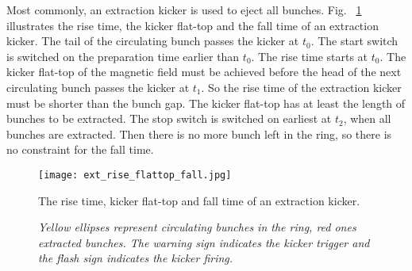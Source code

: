  
%		  
%


Most commonly, an extraction kicker is used to eject all bunches. Fig. ~\ref{ext_rise_flattop_fall} illustrates the rise time, the kicker flat-top and the fall time of an extraction kicker. The tail of the circulating bunch passes the kicker at $t_0$. The start switch is switched on the preparation time earlier than $t_0$. The rise time starts at $t_0$. The kicker flat-top of the magnetic field must be achieved before the head of the next circulating bunch passes the kicker at $t_1$. So the rise time of the extraction kicker must be shorter than the bunch gap. The kicker flat-top has at least the length of bunches to be extracted. The stop switch is switched on earliest at $t_2$, when all bunches are extracted. Then there is no more bunch left in the ring, so there is no constraint for the fall time. 

\begin{figure}[!htb]
   \centering   
   \texttt{[image: ext\_rise\_flattop\_fall.jpg]}
   \caption{The rise time, kicker flat-top and fall time of an extraction kicker.}
	\caption*{\textsl{\small{Yellow ellipses represent circulating bunches in the ring, red ones extracted bunches. The warning sign indicates the kicker trigger and the flash sign indicates the kicker firing. }}}
   \label{ext_rise_flattop_fall}
\end{figure}

